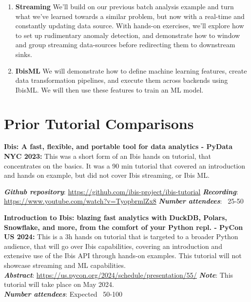 \documentclass[sigconf]{acmart}
\begin{document}
\begin{enumerate}
\item \textbf{Streaming}
\vspace{2pt}
We'll build on our previous batch analysis example and turn what we've learned
towards a similar problem, but now with a real-time and constantly updating data
source. 
With hands-on exercises, we'll explore how to set up rudimentary anomaly
detection, and demonstrate how to window and group streaming data-sources before
redirecting them to downstream sinks.\\

\item \textbf{IbisML}
\vspace{2pt}
We will demonstrate how to define machine learning features, create data
transformation pipelines, and execute them across backends using IbisML. We will
then use these features to train an ML model.

\end{enumerate}

\section{Prior Tutorial Comparisons}

\textbf{Ibis: A fast, flexible, and portable tool for data analytics - PyData NYC 2023:} 
This was a short form of an Ibis hands on tutorial, that concentrates on the basics. It was a 90
min tutorial that covered an introduction and hands on example, but did not cover Ibis streaming, or Ibis ML. 

\begin{flushleft}
\textbf{\textit{Github repository}}: \url{https://github.com/ibis-project/ibis-tutorial}
\textbf{\textit{Recording}}: \url{https://www.youtube.com/watch?v=TyopbrmlZx8}
\textbf{\textit{Number attendees}}: ~25-50

\end{flushleft}

\begin{flushleft}
\textbf{Introduction to Ibis: blazing fast analytics with DuckDB, Polars, Snowflake, and more, from the comfort of your Python repl. - PyCon US 2024:} This is a 3h hands on tutorial that is targeted to a broader Python audience,
that will go over Ibis capabilities, covering an introduction and extensive use of the Ibis API through hands-on examples. This tutorial will not showcase streaming and ML capabilities. \\  

\textbf{\textit{Abstract}}: \url{https://us.pycon.org/2024/schedule/presentation/55/}
\textbf{\textit{Note}}: This tutorial will take place on May 2024.\\
\textbf{\textit{Number attendees}}: Expected ~50-100
\end{flushleft}
\end{document}
